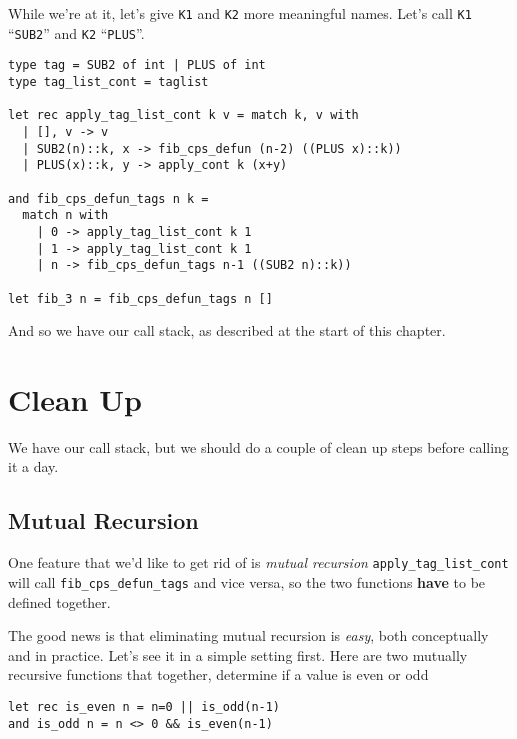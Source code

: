 While we're at it, let's give \texttt{K1} and \texttt{K2} more meaningful names. Let's call \texttt{K1} ``\texttt{SUB2}'' and \texttt{K2} ``\texttt{PLUS}''. 

\begin{code}
\label{code:defun-list-fib}
\begin{verbatim}
type tag = SUB2 of int | PLUS of int
type tag_list_cont = taglist

let rec apply_tag_list_cont k v = match k, v with
  | [], v -> v
  | SUB2(n)::k, x -> fib_cps_defun (n-2) ((PLUS x)::k))
  | PLUS(x)::k, y -> apply_cont k (x+y)

and fib_cps_defun_tags n k = 
  match n with
    | 0 -> apply_tag_list_cont k 1
    | 1 -> apply_tag_list_cont k 1
    | n -> fib_cps_defun_tags n-1 ((SUB2 n)::k))

let fib_3 n = fib_cps_defun_tags n []
\end{verbatim}
\end{code}

And so we have our call stack, as described at the start of this chapter.

\section{Clean Up}
We have our call stack, but we should do a couple of clean up steps before calling it a day. 

\subsection{Mutual Recursion}
One feature that we'd like to get rid of is \emph{mutual recursion} \texttt{apply\_tag\_list\_cont} will call \texttt{fib\_cps\_defun\_tags} and vice versa, so the two functions \textbf{have} to be defined together. 

The good news is that eliminating mutual recursion is \emph{easy}, both conceptually and in practice. Let's see it in a simple setting first. Here are two mutually recursive functions that together, determine if a value is even or odd

\begin{code}
\label{code:mutual-recursion}
\begin{verbatim}
let rec is_even n = n=0 || is_odd(n-1)
and is_odd n = n <> 0 && is_even(n-1)
\end{verbatim}
\end{code}

